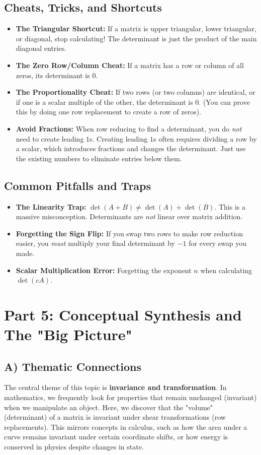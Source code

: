 \documentclass{article}
\begin{document}
\subsection{Cheats, Tricks, and Shortcuts}
\begin{itemize}
    \item \textbf{The Triangular Shortcut:} If a matrix is upper triangular, lower triangular, or diagonal, stop calculating! The determinant is just the product of the main diagonal entries.
    \item \textbf{The Zero Row/Column Cheat:} If a matrix has a row or column of all zeros, its determinant is $0$.
    \item \textbf{The Proportionality Cheat:} If two rows (or two columns) are identical, or if one is a scalar multiple of the other, the determinant is $0$. (You can prove this by doing one row replacement to create a row of zeros).
    \item \textbf{Avoid Fractions:} When row reducing to find a determinant, you do \textit{not} need to create leading $1$s. Creating leading $1$s often requires dividing a row by a scalar, which introduces fractions and changes the determinant. Just use the existing numbers to eliminate entries below them.
\end{itemize}

\subsection{Common Pitfalls and Traps}
\begin{itemize}
    \item \textbf{The Linearity Trap:} $\det(A + B) \neq \det(A) + \det(B)$. This is a massive misconception. Determinants are \textit{not} linear over matrix addition.
    \item \textbf{Forgetting the Sign Flip:} If you swap two rows to make row reduction easier, you \textit{must} multiply your final determinant by $-1$ for every swap you made.
    \item \textbf{Scalar Multiplication Error:} Forgetting the exponent $n$ when calculating $\det(cA)$.
\end{itemize}

\newpage
\section{Part 5: Conceptual Synthesis and The "Big Picture"}

\subsection{A) Thematic Connections}
The central theme of this topic is \textbf{invariance and transformation}. In mathematics, we frequently look for properties that remain unchanged (invariant) when we manipulate an object. Here, we discover that the "volume" (determinant) of a matrix is invariant under shear transformations (row replacements). This mirrors concepts in calculus, such as how the area under a curve remains invariant under certain coordinate shifts, or how energy is conserved in physics despite changes in state.
\end{document}
